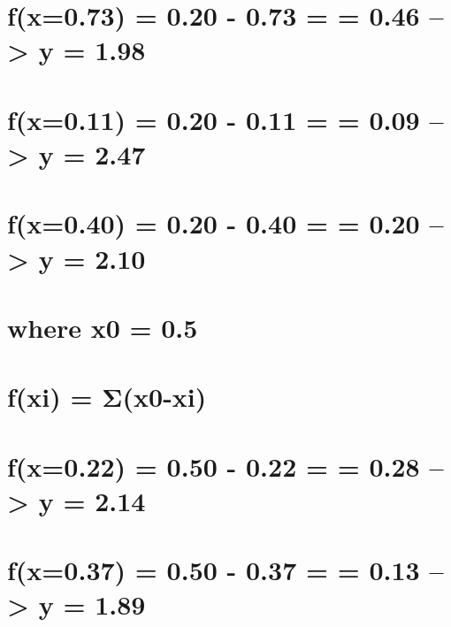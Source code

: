 \documentclass[
  letterpaper,
  DIV=11,
  numbers=noendperiod]{scrreprt}
\begin{document}
{

\chapter{f(x=0.73) = 0.20 - 0.73 = \textbar{} = 0.46
--\textgreater{} y = 1.98}\label{fx0.73-0.20---0.73--0.46-0.46-y-1.98}


\chapter{f(x=0.11) = 0.20 - 0.11 = \textbar{} = 0.09
--\textgreater{} y = 2.47}\label{fx0.11-0.20---0.11-0.09-0.09-y-2.47}


\chapter{f(x=0.40) = 0.20 - 0.40 = \textbar{} = 0.20
--\textgreater{} y = 2.10}\label{fx0.40-0.20---0.40--0.20-0.20-y-2.10}


\chapter{where x0 = 0.5}\label{where-x0-0.5}


\chapter{f(xi) = Σ(x0-xi)}\label{fxi-ux3c3x0-xi-1}


\chapter{f(x=0.22) = 0.50 - 0.22 = \textbar{} = 0.28
--\textgreater{} y = 2.14}\label{fx0.22-0.50---0.22-0.28-0.28-y-2.14}


\chapter{f(x=0.37) = 0.50 - 0.37 = \textbar{} = 0.13
--\textgreater{} y = 1.89}\label{fx0.37-0.50---0.37-0.13-0.13-y-1.89}

}
\end{document}
